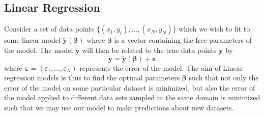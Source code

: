 \documentclass[reprint, english, nofootinbib]{revtex4-2}
\begin{document}
    \subsection{Linear Regression}
        \noindent
        Consider a set of data points $\{(x_1, y_i), \dots, (x_N, y_N)\}$ which we wish to fit to some linear model $\pmb{\tilde y}(\pmb \beta)$ where $\pmb\beta$ is a vector containing the free parameters of the model. The model $\pmb{\tilde y}$ will then be related to the true data points $\pmb y$ by
        \begin{equation}
            \pmb y = \pmb{\tilde y}(\pmb\beta) + \pmb\varepsilon
        \end{equation}
        where $\pmb\varepsilon = (\varepsilon_1, \dots, \varepsilon_N)$ represents the error of the model. The aim of Linear regression models is thus to find the optimal parameters $\pmb\beta$ such that not only the error of the model on some particular dataset is minimized, but also the error of the model applied to different data sets sampled in the same domain is minimized such that we may use our model to make predictions about new datasets.
\end{document}
